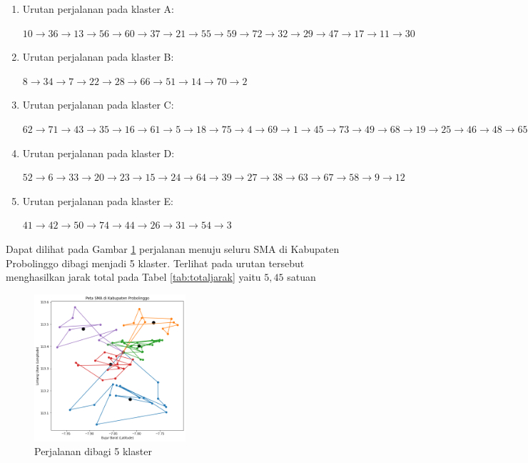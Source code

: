 \begin{enumerate}

\item Urutan perjalanan pada klaster A:

$10\rightarrow36\rightarrow13\rightarrow56\rightarrow60\rightarrow37\rightarrow21\rightarrow55\rightarrow59\rightarrow72\rightarrow32\rightarrow29\rightarrow47\rightarrow17\rightarrow11\rightarrow30$

\item Urutan perjalanan pada klaster B:

$8\rightarrow34\rightarrow7\rightarrow22\rightarrow28\rightarrow66\rightarrow51\rightarrow14\rightarrow70\rightarrow2$

\item Urutan perjalanan pada klaster C:

$62\rightarrow71\rightarrow43\rightarrow35\rightarrow16\rightarrow61\rightarrow5\rightarrow18\rightarrow75\rightarrow4\rightarrow69\rightarrow1\rightarrow45\rightarrow73\rightarrow49\rightarrow68\rightarrow19\rightarrow25\rightarrow46\rightarrow48\rightarrow65\rightarrow40\rightarrow53\rightarrow57$

\item Urutan perjalanan pada klaster D:

$52\rightarrow6\rightarrow33\rightarrow20\rightarrow23\rightarrow15\rightarrow24\rightarrow64\rightarrow39\rightarrow27\rightarrow38\rightarrow63\rightarrow67\rightarrow58\rightarrow9\rightarrow12$

\item Urutan perjalanan pada klaster E:

$41\rightarrow42\rightarrow50\rightarrow74\rightarrow44\rightarrow26\rightarrow31\rightarrow54\rightarrow3$

\end{enumerate}

Dapat dilihat pada Gambar \ref{fig:hasil_mtsp5} perjalanan menuju seluru SMA di Kabupaten Probolinggo dibagi menjadi 5 klaster. Terlihat pada urutan tersebut menghasilkan jarak total pada Tabel \ref{tab:totaljarak} yaitu $5,45$ satuan

\begin{figure}[H]
\centering
\includegraphics[width=0.5\textwidth]{Gambar/hasil_mtsp/5}
\caption{Perjalanan dibagi 5 klaster}
\label{fig:hasil_mtsp5}
\end{figure}

